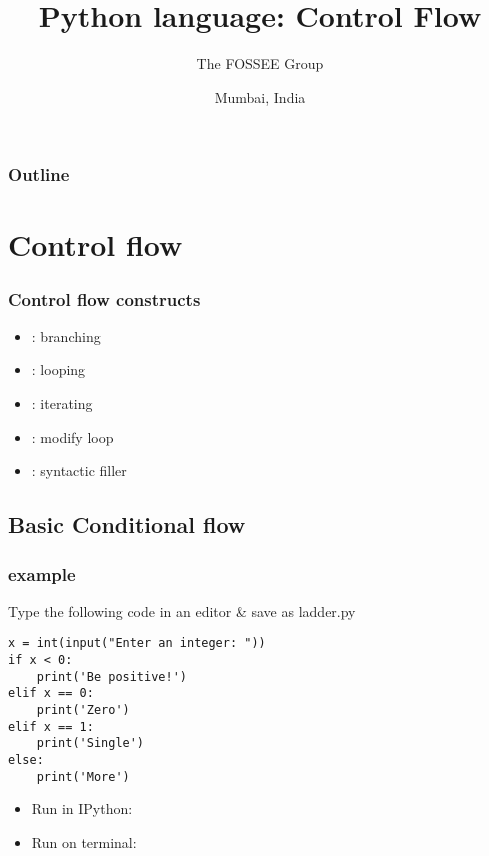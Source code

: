 \documentclass[14pt,compress]{beamer}
\title[Control flow]{Python language: Control Flow}
\author[FOSSEE Team] {The FOSSEE Group}
\institute[FOSSEE -- IITB] {Department of Aerospace Engineering\\IIT Bombay}
\date[] {Mumbai, India}
\begin{document}
\begin{frame}
  \titlepage
\end{frame}

\begin{frame}
  \frametitle{Outline}
  \tableofcontents
\end{frame}

\section{Control flow}

\begin{frame}
  \frametitle{Control flow constructs}
  \begin{itemize}
  \item {}: branching
  \item {}: looping
  \item {}: iterating
  \item {}: modify loop
  \item {}: syntactic filler
  \end{itemize}
\end{frame}

\subsection{Basic Conditional flow}
\begin{frame}[fragile]
  \frametitle{ example}
Type the following code in an editor \& save as \alert{ladder.py}
{  \small
\begin{lstlisting}
x = int(input("Enter an integer: "))
if x < 0:
    print('Be positive!')
elif x == 0:
    print('Zero')
elif x == 1:
    print('Single')
else:
    print('More')
\end{lstlisting}
}
\pause
\begin{itemize}
\item Run in IPython: 
\item Run on terminal: 
\end{itemize}
\end{frame}
\end{document}
